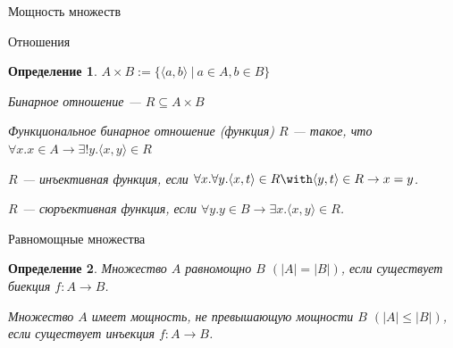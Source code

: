\documentclass[aspectratio=169]{beamer}
\newtheorem{dfn}{Определение}[section]
\begin{document}
\newcommand\doubleplus{+\kern-1.3ex+\kern0.8ex}
\newcommand\mdoubleplus{\ensuremath{\mathbin{+\mkern-10mu+}}}


\begin{frame}{}
\LARGE\begin{center}Мощность множеств\end{center}
\end{frame}

\begin{frame}{Отношения}
\begin{dfn}$A \times B := \{\langle a,b \rangle\ |\ a \in A, b \in B\}$

Бинарное отношение --- $R \subseteq A \times B$

Функциональное бинарное отношение (функция) $R$ --- такое, что $\forall x.x\in A\rightarrow\exists !y.\langle x,y\rangle \in R$

$R$ --- инъективная функция, если $\forall x.\forall y.\langle x,t\rangle \in R\with \langle y,t\rangle \in R \rightarrow x=y$.

$R$ --- сюръективная функция, если $\forall y.y \in B\rightarrow\exists x.\langle x,y\rangle\in R$.\end{dfn}
\end{frame}

\begin{frame}{Равномощные множества}
\begin{dfn}Множество $A$ \emph{равномощно} $B$ $(|A|=|B|)$, если существует биекция
$f: A \rightarrow B$.

Множество $A$ имеет мощность, не превышающую мощности $B$ $(|A|\le|B|)$, если существует инъекция $f: A \rightarrow B$.
\end{dfn}
\end{frame}
\end{document}
